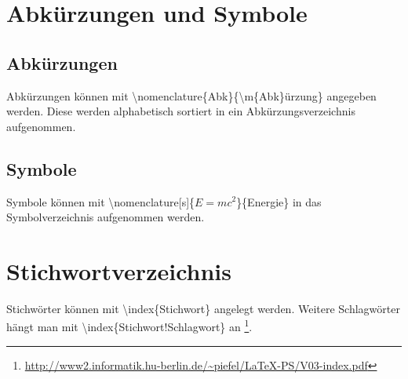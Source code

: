 \section{Abkürzungen und Symbole}
\subsection{Abkürzungen}
Abkürzungen können mit \textbackslash nomenclature\{Abk\}\{\textbackslash m\{Abk\}ürzung\}  angegeben werden. Diese werden alphabetisch sortiert in ein Abkürzungsverzeichnis aufgenommen.
\subsection{Symbole}
Symbole können mit \textbackslash nomenclature[s]\{$E=mc^2$\}\{Energie\}
 in das Symbolverzeichnis aufgenommen werden.
\section{Stichwortverzeichnis}
Stichwörter können mit \textbackslash index\{Stichwort\} angelegt werden. Weitere Schlagwörter hängt man mit \textbackslash index\{Stichwort!Schlagwort\} an \footnote{\url{http://www2.informatik.hu-berlin.de/~piefel/LaTeX-PS/V03-index.pdf}}.
